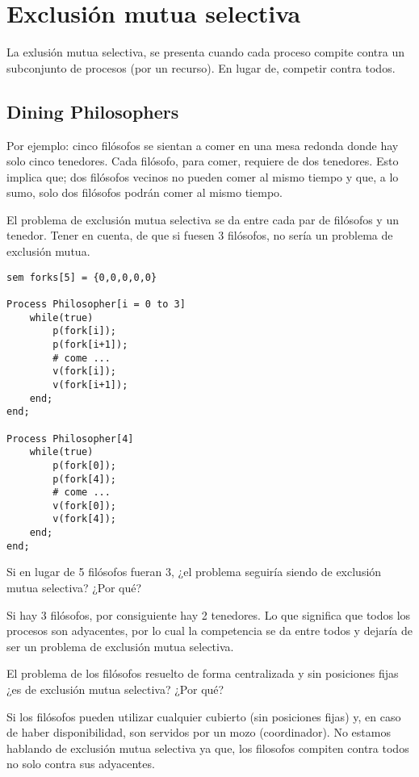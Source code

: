 \documentclass[a4paper, 10pt]{report}
\begin{document}
\section{Exclusión mutua selectiva}

La exlusión mutua selectiva, se presenta cuando cada proceso compite contra un subconjunto de procesos (por un recurso). En lugar de, competir contra todos.

\subsection{Dining Philosophers}

Por ejemplo: cinco filósofos se sientan a comer en una mesa redonda donde hay solo cinco tenedores. Cada filósofo, para comer, requiere de dos tenedores. Esto implica que; dos filósofos vecinos no pueden comer al mismo tiempo y que, a lo sumo, solo dos filósofos podrán comer al mismo tiempo.

El problema de exclusión mutua selectiva se da entre cada par de filósofos y un tenedor. Tener en cuenta, de que si fuesen 3 filósofos, no sería un problema de exclusión mutua.


\begin{lstlisting}[multicols=2]
sem forks[5] = {0,0,0,0,0}

Process Philosopher[i = 0 to 3]
    while(true)
        p(fork[i]);
        p(fork[i+1]);
        # come ...
        v(fork[i]); 
        v(fork[i+1]);
    end;
end;

Process Philosopher[4]
    while(true)
        p(fork[0]);
        p(fork[4]);
        # come ...
        v(fork[0]); 
        v(fork[4]);
    end;
end;
\end{lstlisting}

\begin{basic_box}
     Si en lugar de 5 filósofos fueran 3, ¿el problema seguiría siendo de exclusión mutua selectiva? ¿Por qué?

    Si hay 3 filósofos, por consiguiente hay 2 tenedores. Lo que significa que todos los procesos son adyacentes, por lo cual la competencia se da entre todos y dejaría de ser un problema de exclusión mutua selectiva.
\end{basic_box}
\begin{basic_box}
     El problema de los filósofos resuelto de forma centralizada y sin posiciones fijas ¿es de exclusión mutua selectiva? ¿Por qué?

    Si los filósofos pueden utilizar cualquier cubierto (sin posiciones fijas) y, en caso de haber disponibilidad, son servidos por un mozo (coordinador). No estamos hablando de exclusión mutua selectiva ya que, los filosofos compiten contra todos no solo contra sus adyacentes.
\end{basic_box}
\end{document}
